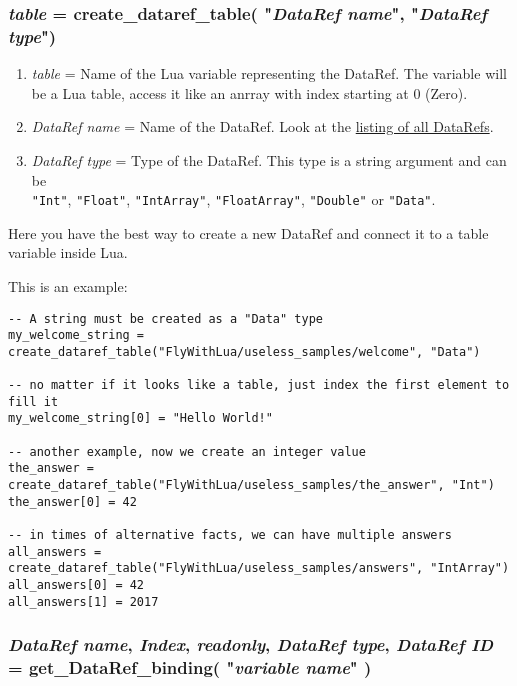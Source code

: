 \documentclass[11pt,parskip=half,a4paper]{scrartcl}
\begin{document}
\subsubsection{\emph{table} = create\_dataref\_table( "\emph{DataRef name}", "\emph{DataRef type}")}

\begin{enumerate}
	\item \emph{table} = Name of the Lua variable representing the DataRef. The variable will be a Lua table, access it like an anrray with index starting at 0 (Zero). 
	\item \emph{DataRef name} = Name of the DataRef. Look at the \href{http://www.xsquawkbox.net/xpsdk/docs/DataRefs.html}{listing of all DataRefs}.
	\item \emph{DataRef type} = Type of the DataRef. This type is a string argument and can be\\ \verb|"Int"|, \verb|"Float"|, \verb|"IntArray"|, \verb|"FloatArray"|, \verb|"Double"| or \verb|"Data"|.
\end{enumerate}

Here you have the best way to create a new DataRef and connect it to a table variable inside Lua.

This is an example:

\begin{lstlisting}
-- A string must be created as a "Data" type
my_welcome_string = create_dataref_table("FlyWithLua/useless_samples/welcome", "Data")

-- no matter if it looks like a table, just index the first element to fill it
my_welcome_string[0] = "Hello World!"

-- another example, now we create an integer value
the_answer = create_dataref_table("FlyWithLua/useless_samples/the_answer", "Int")
the_answer[0] = 42

-- in times of alternative facts, we can have multiple answers
all_answers = create_dataref_table("FlyWithLua/useless_samples/answers", "IntArray")
all_answers[0] = 42
all_answers[1] = 2017
\end{lstlisting}


\subsubsection{\emph{DataRef name}, \emph{Index}, \emph{readonly}, \emph{DataRef type}, \emph{DataRef ID} = get\_DataRef\_binding( "\emph{variable name}" )}
\end{document}
